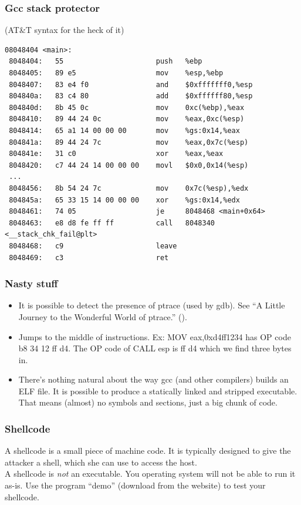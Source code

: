 \documentclass[slidestop,compress,mathserif, xcolor=table]{beamer}
\begin{document}
\begin{frame}[fragile]
  \frametitle{Gcc stack protector}

  (AT\&T syntax for the heck of it)
\tiny
\begin{verbatim}
08048404 <main>:
 8048404:	55                   	push   %ebp
 8048405:	89 e5                	mov    %esp,%ebp
 8048407:	83 e4 f0             	and    $0xfffffff0,%esp
 804840a:	83 c4 80             	add    $0xffffff80,%esp
 804840d:	8b 45 0c             	mov    0xc(%ebp),%eax
 8048410:	89 44 24 0c          	mov    %eax,0xc(%esp)
 8048414:	65 a1 14 00 00 00    	mov    %gs:0x14,%eax
 804841a:	89 44 24 7c          	mov    %eax,0x7c(%esp)
 804841e:	31 c0                	xor    %eax,%eax
 8048420:	c7 44 24 14 00 00 00 	movl   $0x0,0x14(%esp)
 ...
 8048456:	8b 54 24 7c          	mov    0x7c(%esp),%edx
 804845a:	65 33 15 14 00 00 00 	xor    %gs:0x14,%edx
 8048461:	74 05                	je     8048468 <main+0x64>
 8048463:	e8 d8 fe ff ff       	call   8048340 <__stack_chk_fail@plt>
 8048468:	c9                   	leave
 8048469:	c3                   	ret
\end{verbatim}
\end{frame}

\begin{frame}
  \frametitle{Nasty stuff}

  \begin{itemize}
  \item It is possible to detect the presence of ptrace (used by gdb). See ``A
    Little Journey to the Wonderful World of ptrace.'' (\cite{ptrace-journey}).
  \item Jumps to the middle of instructions. Ex: MOV eax,0xd4ff1234 has OP code
    b8 34 12 ff d4. The OP code of CALL esp is ff d4 which we find three bytes
    in.
  \item There's nothing natural about the way gcc (and other compilers) builds
    an ELF file. It is possible to produce a statically linked and stripped
    executable. That means (almost) no symbols and sections, just a big chunk of
    code.
  \end{itemize}
\end{frame}

\begin{frame}
  \frametitle{Shellcode}

  A shellcode is a small piece of machine code. It is typically designed to give
  the attacker a shell, which she can use to access the host.\\[1em]

  A shellcode is \emph{not} an executable. You operating system will not be able
  to run it as-is. Use the program ``demo'' (download from the website) to test your
  shellcode.

\end{frame}
\end{document}
